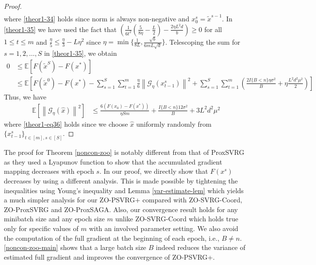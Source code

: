 \documentclass{article}
\newcommand*{\G}{\mathcal{G}}
\newcommand*{\E}{\mathbb{E}}
\newcommand{\norm}[1]{\left\lVert#1\right\rVert}
\theoremstyle{definition}
\theoremstyle{remark}
\begin{document}
\begin{proof}
\begin{align}
 \end{align}
 where \eqref{theor1-34} holds since norm is always non-negative and $x_0^s = \tilde{x}^{s-1}$. In \eqref{theor1-35} we have used the fact that $(\frac{1}{6t^2}(\frac{5}{8\eta} - \frac{L}{2})-\frac{2\eta L^2 d}{b})\geq 0$ for all $1\leq t \leq m$ and $\frac{\eta}{5} \leq \frac{\eta}{3}-L\eta^2$ since $\eta = \min\{\frac{1}{8L}, \frac{\sqrt{b}}{6mL\sqrt{d}}\}$. 
 Telescoping the sum for $s = 1, 2, \ldots, S$ in \eqref{theor1-35}, we obtain
 \begin{equation*}
\begin{split} 
0 &\leq \E[F(\tilde{x}^S) - F({x}^*)] \\
&\leq \E\left[F(\tilde{x}^{0}) - F({x}^*) - \sum_{s=1}^S\sum_{t=1}^m\frac{\eta}{6}\norm{\G_{\eta}(x_{t-1}^s)}^2 + \sum_{s=1}^S\sum_{t=1}^m(\frac{2I\{B < n\}\eta \sigma ^2}{B}+\eta \frac{L^2 d^2 \mu^2}{2})\right]
 \end{split}
 \end{equation*}
 Thus, we have
  \begin{align}
\E[\norm{\G_{\eta}(\hat{x})}^2] & \leq \frac{6\left(F(x_0) - F({x}^*)\right)}{\eta Sm} + \frac{I\{B < n\}12\sigma ^2}{B}+3{L^2 d^2 \mu^2}\label{theor1-eq36}
 \end{align}
 where \eqref{theor1-eq36} holds since we choose  $\hat{x}$ uniformly randomly from $\{x_{t-1}^s\}_{t\in [m], s\in [S]}$. 
\end{proof} 
{\color{Violet}
The proof for Theorem \ref{noncon-zoo} is notably different from that of ProxSVRG \cite{} as they used a Lyapunov function to show that the accumulated gradient mapping decreases with epoch $s$. In our proof, we directly show that $F(x^s)$ decreases by  using a different analysis. This is made possible by tightening the inequalities using Young's inequality and Lemma \ref{var-estimate-lem} which yields a much simpler analysis for our ZO-PSVRG+ compared with ZO-SVRG-Coord, ZO-ProxSVRG and ZO-ProxSAGA.  Also, our convergence result holds for any minibatch size and any epoch size $m$ unlike ZO-SVRG-Coord which holds true only for specific values of $m$ with an involved parameter setting.
We also avoid the computation of the full gradient at the beginning of each epoch, i.e., $B \neq n$.
} \eqref{noncon-zoo-main} shows that a large batch size $B$ indeed reduces the variance of estimated full gradient and improves the convergence of ZO-PSVRG+.
 
\end{document}
